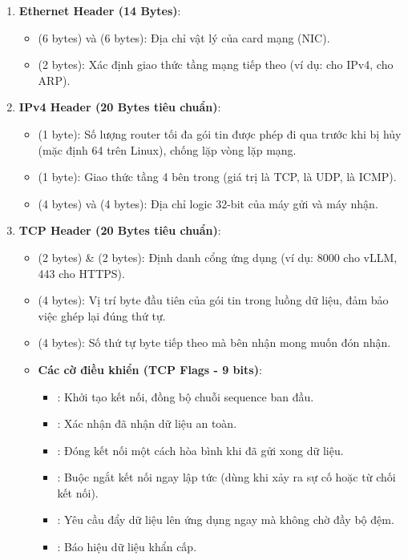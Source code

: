 \begin{enumerate}
  \item \textbf{Ethernet Header (14 Bytes)}:
  \begin{itemize}
    \item {} (6 bytes) và  (6 bytes): Địa chỉ vật lý của card mạng (NIC).
    \item {} (2 bytes): Xác định giao thức tầng mạng tiếp theo (ví dụ:  cho IPv4,  cho ARP).
  \end{itemize}
  \item \textbf{IPv4 Header (20 Bytes tiêu chuẩn)}:
  \begin{itemize}
    \item {} (1 byte): Số lượng router tối đa gói tin được phép đi qua trước khi bị hủy (mặc định 64 trên Linux), chống lặp vòng lặp mạng.
    \item {} (1 byte): Giao thức tầng 4 bên trong (giá trị  là TCP,  là UDP,  là ICMP).
    \item {} (4 bytes) và  (4 bytes): Địa chỉ logic 32-bit của máy gửi và máy nhận.
  \end{itemize}
  \item \textbf{TCP Header (20 Bytes tiêu chuẩn)}:
  \begin{itemize}
    \item {} (2 bytes) \&  (2 bytes): Định danh cổng ứng dụng (ví dụ: 8000 cho vLLM, 443 cho HTTPS).
    \item {} (4 bytes): Vị trí byte đầu tiên của gói tin trong luồng dữ liệu, đảm bảo việc ghép lại đúng thứ tự.
    \item {} (4 bytes): Số thứ tự byte tiếp theo mà bên nhận mong muốn đón nhận.
    \item \textbf{Các cờ điều khiển (TCP Flags - 9 bits)}:
      \begin{itemize}
        \item {}: Khởi tạo kết nối, đồng bộ chuỗi sequence ban đầu.
        \item {}: Xác nhận đã nhận dữ liệu an toàn.
        \item {}: Đóng kết nối một cách hòa bình khi đã gửi xong dữ liệu.
        \item {}: Buộc ngắt kết nối ngay lập tức (dùng khi xảy ra sự cố hoặc từ chối kết nối).
        \item {}: Yêu cầu đẩy dữ liệu lên ứng dụng ngay mà không chờ đầy bộ đệm.
        \item {}: Báo hiệu dữ liệu khẩn cấp.
      \end{itemize}
  \end{itemize}
\end{enumerate}

